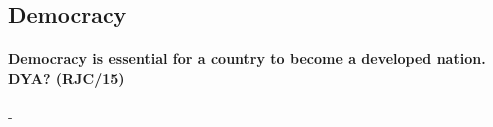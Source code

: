 \documentclass[../../main]{subfiles}
\begin{document}
\subsection{Democracy}

\paragraph{Democracy is essential for a country to become a developed nation. DYA? (RJC/15)}-

\paragraph{}
\end{document}
